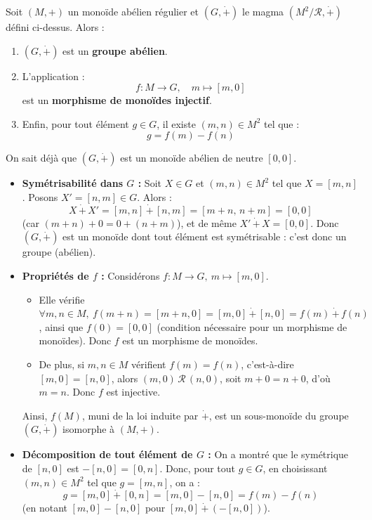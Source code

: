 \documentclass[a4paper,11pt]{article}
\newcommand{\mot}[1]{\textcolor{bordeaux}{\textbf{#1}}}
\begin{document}
\begin{theoreme}
Soit $(M, +)$ un monoïde abélien régulier et $(G, \dot{+})$ le magma $(M^2 / \mathcal{R}, \dot{+})$ défini ci-dessus.
Alors :
\begin{enumerate}
    \item $(G, \dot{+})$ est un \mot{groupe abélien}.
    \item L'application :
    \[
    f : M \longrightarrow G, \quad m \longmapsto [m, 0]
    \]
    est un \mot{morphisme de monoïdes injectif}.
    \item Enfin, pour tout élément $g \in G$, il existe $(m, n) \in M^2$ tel que :
    \[
    g = f(m) - f(n)
    \]
\end{enumerate}
\end{theoreme}

\begin{demonstration}
On sait déjà que $(G, \dot{+})$ est un monoïde abélien de neutre $[0, 0]$.

\begin{itemize}
    \item \textbf{Symétrisabilité dans $G$ :} Soit $X \in G$ et $(m, n) \in M^2$ tel que $X = [m, n]$.
    Posons $X' = [n, m] \in G$. Alors :
    \[
    X \, \dot{+} \, X' = [m, n] \, \dot{+} \, [n, m] = [m + n, \, n + m] = [0, 0]
    \]
    (car $(m + n) + 0 = 0 + (n + m)$), et de même $X' \, \dot{+} \, X = [0, 0]$.
    Donc $(G, \dot{+})$ est un monoïde dont tout élément est symétrisable : c'est donc un groupe (abélien).

    \item \textbf{Propriétés de $f$ :} Considérons $f : M \to G, \ m \mapsto [m, 0]$.
    \begin{itemize}
        \item Elle vérifie $\forall m, n \in M, \ f(m + n) = [m + n, 0] = [m, 0] \, \dot{+} \, [n, 0] = f(m) \, \dot{+} \, f(n)$, ainsi que $f(0) = [0, 0]$ (condition nécessaire pour un morphisme de monoïdes). Donc $f$ est un morphisme de monoïdes.
        \item De plus, si $m, n \in M$ vérifient $f(m) = f(n)$, c'est-à-dire $[m, 0] = [n, 0]$, alors $(m, 0) \, \mathcal{R} \, (n, 0)$, soit $m + 0 = n + 0$, d'où $m = n$. Donc $f$ est injective.
    \end{itemize}
    Ainsi, $f(M)$, muni de la loi induite par $\dot{+}$, est un sous-monoïde du groupe $(G, \dot{+})$ isomorphe à $(M, +)$.

    \item \textbf{Décomposition de tout élément de $G$ :} On a montré que le symétrique de $[n, 0]$ est $-[n, 0] = [0, n]$.
    Donc, pour tout $g \in G$, en choisissant $(m, n) \in M^2$ tel que $g = [m, n]$, on a :
    \[
    g = [m, 0] \, \dot{+} \, [0, n] = [m, 0] - [n, 0] = f(m) - f(n)
    \]
    (en notant $[m, 0] - [n, 0]$ pour $[m, 0] \, \dot{+} \, (-[n, 0])$).
\end{itemize}
\end{demonstration}
\end{document}
